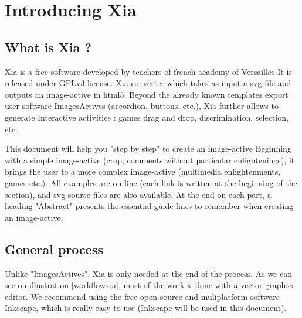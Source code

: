 


 \maketitle
 \tableofcontents
 
 
\section{Introducing Xia}

\subsection{What is Xia ?}

Xia is a free software developed by teachers of french academy of Versailles
It is released under \href{http://www.gnu.org/copyleft/gpl.html}{GPLv3} license.
Xia converter which takes as input a svg file and outputs an image-active in 
html5. Beyond the already known templates export user software ImagesActives 
(\href{http://images-actives.crdp-versailles.fr/spip.php?article11\&lang=fr}
{accordion, buttons, etc.}), Xia further allows to generate
Interactive activities : games drag and drop, discrimination, selection, etc.

This document will help you "step by step" to create an image-active
Beginning with a simple image-active (crop, comments without particular 
enlightenings), it brings the user to a more complex image-active (multimedia
 enlightenments, games etc.). All examples are on line (each link is written at 
the beginning of the section), and svg source files are also available. At the end
on each part, a heading "Abstract" presents the essential guide lines to 
remember when creating an image-active.

\subsection{General process}

Unlike "ImagesActives", Xia is only needed at the end of the process.
As we can see on illustration \ref{workflowxia}, most of the work is done with 
a  vector graphics editor. We recommend using the free open-source and 
muliplatform software \href{http://www.inkscape.org/}{Inkscape}, which is 
really easy to use (Inkscape will be used in this document).

